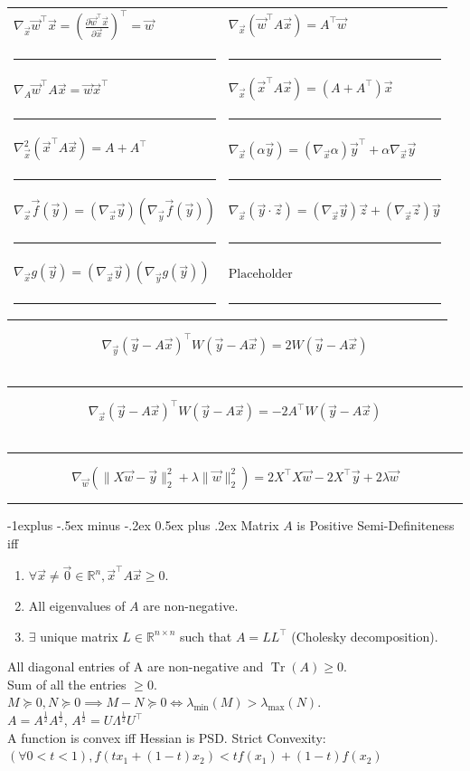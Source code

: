 \documentclass[10pt,landscape]{article}
\makeatletter
\DeclareMathOperator*{\trace}{Tr}
\newcommand{\pderiv}[2]{\frac{\partial #1}{\partial #2}}
\newcommand{\wrap}[3]{\left#1#3\right#2}
\renewcommand{\subsection}{\@startsection{subsection}{2}{0mm}%
                                {-1explus -.5ex minus -.2ex}%
                                {0.5ex plus .2ex}%
                                {\normalfont\normalsize\bfseries}}
\makeatother
\begin{document}
\begin{multicols}{3}
\begin{tabular}{@{}p{}%
                @{}p{}@{}}
$\nabla_{\vec x}{\vec w^\top \vec x} = \wrap(){\pderiv{\vec w^\top \vec x}{\vec x}}^\top = \vec{w}$ & $\nabla_{\vec x}{(\vec w^\top A\vec x)}= A^{\top}\vec w$ \\
\hrule&\hrule\\
$\nabla_{A}{\vec w^\top A\vec x}=\vec w\vec x^\top$ & $\nabla_{\vec x}{(\vec x^\top A\vec x)} = (A+A^\top)\vec x$ \\
\hrule&\hrule\\
$\nabla_{\vec x}^2{(\vec x^\top A\vec x)} = A+A^\top$ & $\nabla_{\vec x}{(\alpha \vec{y})} = (\nabla_{\vec x}{\alpha})\vec{y}^{\top} + \alpha \nabla_{\vec x}{\vec y}$ \\
\hrule&\hrule
\\
$\nabla_{\vec x}{\vec{f}(\vec y)} = (\nabla_{\vec x}{\vec y})(\nabla_{\vec y}{\vec{f}(\vec y)})$ & $\nabla_{\vec x}(\vec{y} \cdot \vec{z}) = (\nabla_{\vec x}{\vec y})\vec{z}+(\nabla_{\vec x}{\vec z})\vec{y}$ \\
\hrule & \hrule
\\
$\nabla_{\vec x}{g(\vec{y})} = (\nabla_{\vec x}{\vec y})(\nabla_{\vec y}{g(\vec y)})$ & $\text{Placeholder}$ \\
\hrule&\hrule
\end{tabular} \vspace{-0.1cm}
$$\nabla_{\vec{y}} (\vec{y} - A \vec{x})^{\top} W(\vec{y} - A \vec{x}) = 2W(\vec{y} - A \vec{x})$$ \\
\hrule
$$\nabla_{\vec{x}} (\vec{y} - A \vec{x})^{\top} W(\vec{y} - A \vec{x}) = -2A^{\top}W(\vec{y} - A \vec{x})$$  \\
\hrule
$$\nabla_{\vec w} \wrap(){\|X\vec w-\vec y\|_2^2+\lambda\|\vec w\|_2^2} = 2X^\top X\vec w-2X^\top \vec y+2\lambda\vec w$$
\hrule

\subsection{Matrix $A$ is Positive Semi-Definiteness iff}
\begin{enumerate}[label=(\alph*)]
    \item $\forall \vec x \neq \vec{0} \in \mathbb{R}^{n}, \vec x^{\top} A \vec x \geq 0$.
    \item All eigenvalues of $A$ are non-negative.
    \item $\exists$ unique matrix $L \in \mathbb{R}^{n \times n}$ such that $A=L L^{\top}$ (Cholesky decomposition).
\end{enumerate}
All diagonal entries of A are non-negative and $\trace(A)\geq0$. \\
Sum of all the entries $\geq0$.\\
$M\succeq0, N\succeq0\implies M-N\succeq0\iff\lambda_{\min}(M)>\lambda_{\max}(N)$.\\
$A = A^{\frac{1}{2}}A^{\frac{1}{2}}$, $A^{\frac{1}{2}} = U \Lambda^{\frac{1}{2}}U^{\top}$  \\
A function is convex iff Hessian is PSD. Strict Convexity: $(\forall 0<t<1), f(tx_1+(1-t)x_2)<tf(x_1)+(1-t)f(x_2)$



\end{multicols}
\end{document}
